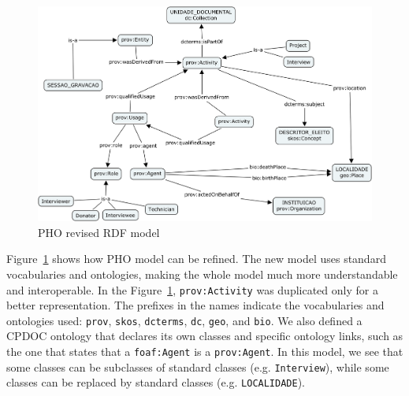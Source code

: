 \begin{figure}[htbp]
  \centering
  \includegraphics[width=.8\textwidth]{pho-new.png}
  \caption{PHO revised RDF model}\label{fig:pho-new}
\end{figure}

Figure~\ref{fig:pho-new} shows how PHO model can be refined. The new
model uses standard vocabularies and ontologies, making the whole
model much more understandable and interoperable. In the
Figure~\ref{fig:pho-new}, \texttt{prov:Activity} was duplicated only
for a better representation. The prefixes in the names indicate the
vocabularies and ontologies used: \texttt{prov}, \texttt{skos},
\texttt{dcterms}, \texttt{dc}, \texttt{geo}, and \texttt{bio}. We also
defined a CPDOC ontology that declares its own classes and specific
ontology links, such as the one that states that a \texttt{foaf:Agent}
is a \texttt{prov:Agent}. In this model, we see that some classes can
be subclasses of standard classes (e.g. \texttt{Interview}), while
some classes can be replaced by standard classes
(e.g. \texttt{LOCALIDADE}).

